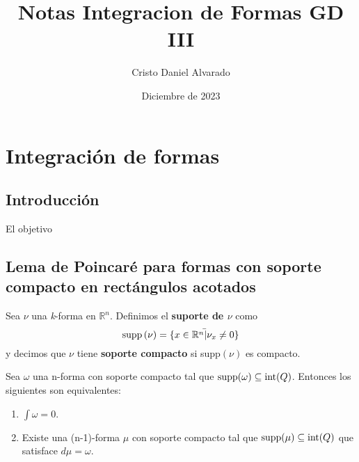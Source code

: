 \documentclass[12pt]{report}
\theoremstyle{largebreak}
\begin{document}
    \title{Notas Integracion de Formas GD III}
    \author{Cristo Daniel Alvarado}
    \date{Diciembre de 2023}
    \maketitle

    \tableofcontents %

    \setcounter{chapter}{2} %
    \chapter{Integración de formas}
    
    \section{Introducción}
    El objetivo 
    \section{Lema de Poincaré para formas con soporte compacto en rectángulos acotados}
    
    \begin{mydef}
        Sea $\nu$ una \textit{k}-forma en $\mathbb{R}^{n}$. Definimos el \textbf{suporte de $\nu$} como
        \begin{equation*}
            \textup{supp}\left(\nu\right)=\bar{\left\{x\in\mathbb{R}^n|\nu_x\neq0\right\}}
        \end{equation*}
        y decimos que $\nu$ tiene \textbf{soporte compacto} si supp$(\nu)$ es compacto.
    \end{mydef}

    \begin{theor}
        Sea $\omega$ una n-forma con soporte compacto tal que $\textup{supp}(\omega)\subseteq\textup{int}(Q)$. Entonces los siguientes son equivalentes:
        \begin{enumerate}
            \item $\int \omega = 0$.
            \item Existe una (n-1)-forma $\mu$ con soporte compacto tal que $\textup{supp}(\mu)\subseteq\textup{int}(Q)$ que satisface $d\mu=\omega$.
        \end{enumerate}
    \end{theor}
\end{document}
